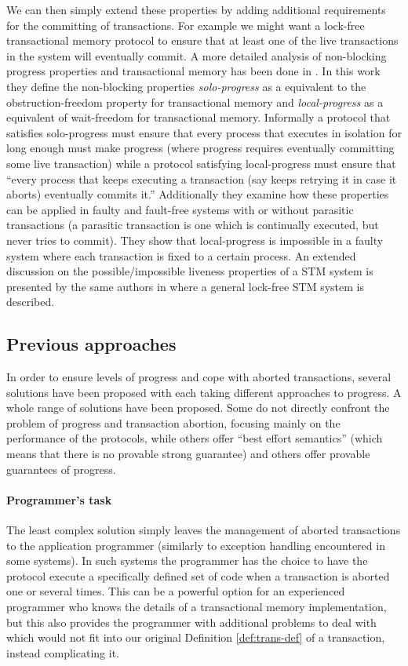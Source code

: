 We can then simply extend these properties by adding additional requirements
for the committing of transactions.
For example we might want a lock-free transactional memory protocol
to ensure that at least one of the live transactions in the system will
eventually commit.
A more detailed analysis of non-blocking progress properties and
transactional memory has been done in \cite{BGK12}.
In this work they define the non-blocking properties
\emph{solo-progress}
as a equivalent to the obstruction-freedom property
for transactional memory and
\emph{local-progress} as a equivalent
of wait-freedom for transactional memory.
Informally a protocol that satisfies solo-progress must ensure
that every process that executes in isolation for long enough
must make progress (where progress requires eventually committing
some live transaction) while a protocol satisfying
local-progress must ensure that
``every process that keeps
executing a transaction (say keeps retrying it in case it aborts)
eventually commits it.''
Additionally they examine how these properties can be applied
in faulty and fault-free systems with or without parasitic transactions
(a parasitic transaction is one which is continually executed, but never
tries to commit).
They show that local-progress is impossible in a faulty system
where each transaction is fixed to a certain process.
An extended discussion on the possible/impossible liveness properties 
of a STM system is presented by the same authors in \cite{GK10} where a general 
 lock-free STM system is described.

\subsection{Previous approaches}
In order to ensure levels of progress and cope with aborted transactions,
several solutions have been proposed with each taking different approaches
to progress.
A whole range of solutions have been proposed.
Some do not directly confront the problem of progress and transaction abortion,
focusing mainly on the performance of the protocols, while
others  offer   ``best effort semantics'' 
(which  means that there is no provable  strong guarantee)
and others offer provable guarantees of progress.

\paragraph{Programmer's task}
The least complex solution simply leaves the  management of aborted transactions
to the application programmer (similarly to  exception handling
encountered  in  some systems).
In such systems the programmer has the choice to have the protocol execute 
a specifically defined set of code when a transaction is aborted one or several times.
This can be a powerful option for an experienced programmer who knows the details
of a transactional memory implementation, but this also provides the programmer
with additional problems to deal with which would not fit into our
original Definition \ref{def:trans-def} of a transaction, instead
complicating it.



